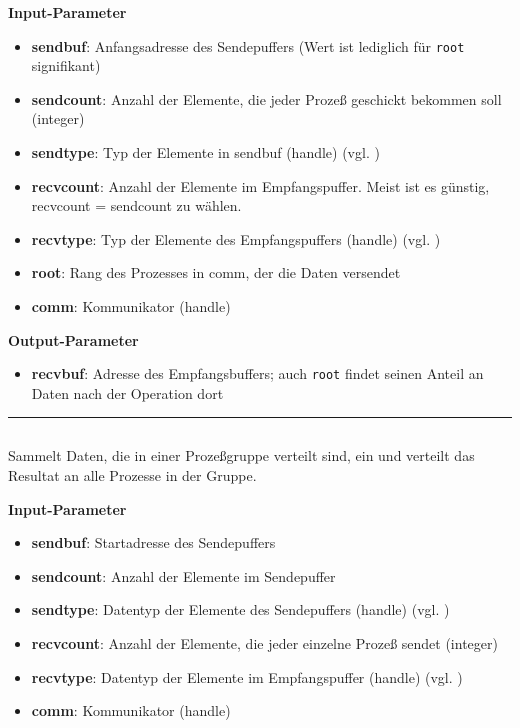 \textbf{Input-Parameter}
\begin{itemize}
    \item \textbf{sendbuf}: Anfangsadresse des Sendepuffers (Wert ist lediglich für \texttt{root} signifikant) 
    \item \textbf{sendcount}: Anzahl der Elemente, die jeder Prozeß geschickt bekommen soll (integer) 
    \item \textbf{sendtype}: Typ der Elemente in sendbuf (handle) (vgl. )
    \item \textbf{recvcount}: Anzahl der Elemente im Empfangspuffer. Meist ist es günstig, recvcount = sendcount zu wählen. 
    \item \textbf{recvtype}: Typ der Elemente des Empfangspuffers (handle) (vgl. )
    \item \textbf{root}: Rang des Prozesses in comm, der die Daten versendet
    \item \textbf{comm}: Kommunikator (handle)
\end{itemize}

\textbf{Output-Parameter}
\begin{itemize}
    \item \textbf{recvbuf}: Adresse des Empfangsbuffers; auch \texttt{root} findet seinen Anteil an Daten nach der Operation dort
\end{itemize}
\goodbreak
\rule{\textwidth}{0.4pt}%
\inputminted[numbersep=5pt, tabsize=4]{c}{scripts/mpi/mpi-allgather.c}
Sammelt Daten, die in einer Prozeßgruppe verteilt sind, ein und verteilt das Resultat an alle Prozesse in der Gruppe.

\textbf{Input-Parameter}
\begin{itemize}
    \item \textbf{sendbuf}: Startadresse des Sendepuffers 
    \item \textbf{sendcount}: Anzahl der Elemente im Sendepuffer
    \item \textbf{sendtype}: Datentyp der Elemente des Sendepuffers (handle) (vgl. )
    \item \textbf{recvcount}:  Anzahl der Elemente, die jeder einzelne Prozeß sendet (integer) 
    \item \textbf{recvtype}: Datentyp der Elemente im Empfangspuffer (handle) (vgl. )
    \item \textbf{comm}: Kommunikator (handle)
\end{itemize}

